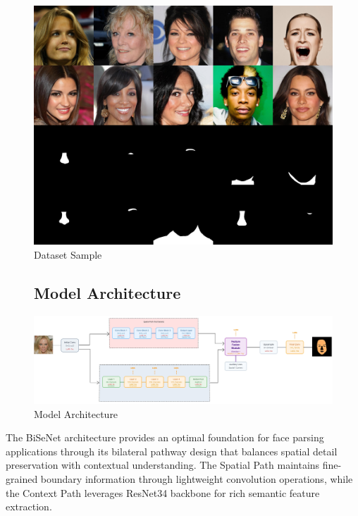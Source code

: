 \documentclass[12pt,a4paper]{report}
\begin{document}
\begin{figure}[H]
\centering
\includegraphics[width=1.0\textwidth]{figures/dataset_sample.png}
\caption{Dataset Sample}
\label{fig:dataset_sample}
\end{figure}

\begin{landscape}
\begin{figure}[H]
\subsection{Model Architecture}
\centering
\includegraphics[width=1.5\textwidth]{figures/lora_bisenet_diagram.jpg}
\caption{Model Architecture}
\label{fig:model_architecture}
\end{figure}
\end{landscape}


The BiSeNet architecture \cite{yu2018bisenet} provides an optimal foundation for face parsing applications through its bilateral pathway design that balances spatial detail preservation with contextual understanding. The Spatial Path maintains fine-grained boundary information through lightweight convolution operations, while the Context Path leverages ResNet34 backbone \cite{he2016deep} for rich semantic feature extraction.
\end{document}
